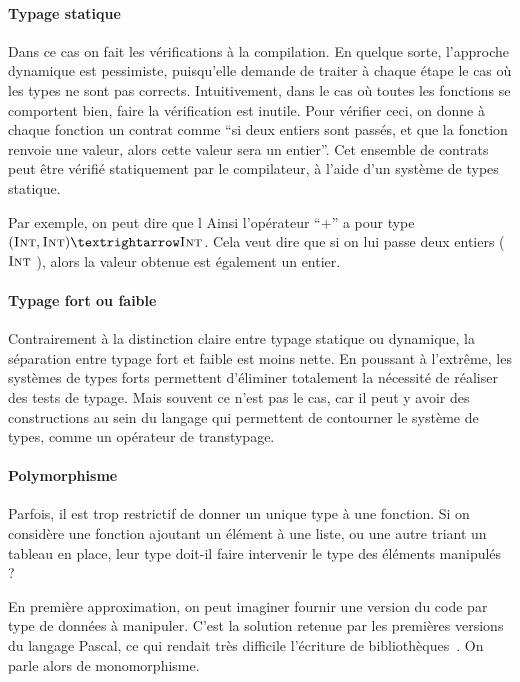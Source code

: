 \paragraph{Typage statique}

Dans ce cas on fait les vérifications à la compilation. En quelque sorte,
l'approche dynamique est pessimiste, puisqu'elle demande de traiter à chaque
étape le cas où les types ne sont pas corrects. Intuitivement, dans le cas où
toutes les fonctions se comportent bien, faire la vérification est inutile. Pour
vérifier ceci, on donne à chaque fonction un contrat comme ``si deux entiers
sont passés, et que la fonction renvoie une valeur, alors cette valeur sera un
entier''. Cet ensemble de contrats peut être vérifié statiquement par le
compilateur, à l'aide d'un système de types statique.

Par exemple, on peut dire que l Ainsi l'opérateur ``$+$'' a pour type $(\tInt,
\tInt) → \tInt$. Cela veut dire que si on lui passe deux entiers ($\textsc{Int}$
\tInt), alors la valeur obtenue est également un entier.

\paragraph{Typage fort ou faible}

Contrairement à la distinction claire entre typage statique ou dynamique, la
séparation entre typage fort et faible est moins nette. En poussant à l'extrême,
les systèmes de types forts permettent d'éliminer totalement la nécessité de
réaliser des tests de typage. Mais souvent ce n'est pas le cas, car il peut y
avoir des constructions au sein du langage qui permettent de contourner le
système de types, comme un opérateur de transtypage.

\paragraph{Polymorphisme}

Parfois, il est trop restrictif de donner un unique type à une fonction. Si on
considère une fonction ajoutant un élément à une liste, ou une autre
triant un tableau en place, leur type doit-il faire intervenir le type des
éléments manipulés ?

En première approximation, on peut imaginer fournir une version du code par type
de données à manipuler. C'est la solution retenue par les premières versions du
langage Pascal, ce qui rendait très difficile l'écriture de
bibliothèques~\cite{PascalNoEscape}. On parle alors de monomorphisme.

